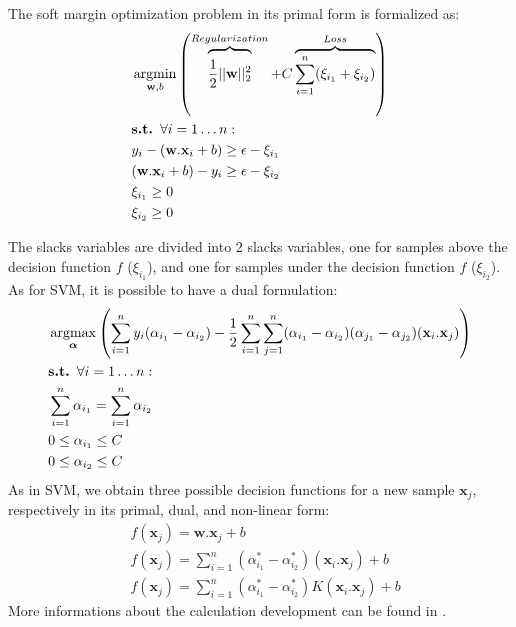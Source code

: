 \noindent The soft margin optimization problem in its primal form is formalized as:
	\begin{align}
		& \argmin_{\textbf{w},b}  \left( 
		\overbrace{\vphantom{\sum_{i=1}^n \xi_i}
			\frac{1}{2}||\textbf{w}||^2_2}^{Regularization}
		+ C \overbrace{\sum\limits_{i=1}^{n}(\xi_{i_1}+\xi_{i_2})}^{Loss}
		\right) 
		\label{eq:objectiveSVR}\\
		& \textbf{s.t. } \forall i=1 \ldots n: \nonumber\\
		& y_i-(\textbf{w}.\textbf{x}_i+b) \geq \epsilon -\xi_{i_1} \\
		& (\textbf{w}.\textbf{x}_i+b)-y_i \geq \epsilon -\xi_{i_2} \\
		&  \xi_{i_1} \geq 0 \\
		&  \xi_{i_2} \geq 0
	\end{align}

\noindent The slacks variables are divided into 2 slacks variables, one for samples above the decision function $f$ ($\xi_{i_1}$), and one for samples under the decision function $f$ ($\xi_{i_2}$). As for SVM, it is possible to have a dual formulation:
	\begin{align}
		& \argmax_{\boldsymbol{\alpha}} 
		\left( 
		\sum\limits_{i=1}^{n} y_i(\alpha_{i_1}-\alpha_{i_2})
		-\frac{1}{2} \sum\limits_{i=1}^{n} \sum\limits_{j=1}^{n} (\alpha_{i_1}-\alpha_{i_2})(\alpha_{j_1}-\alpha_{j_2}) (\textbf{x}_i.\textbf{x}_j)
		\right) \\ 
		& \textbf{s.t. } \forall i=1 \ldots n: \nonumber\\
		& \sum\limits_{i=1}^{n} \alpha_{i_1} = \sum\limits_{i=1}^{n} \alpha_{i_2} \\
		& 0 \leq \alpha_{i_1} \leq C \\
		& 0 \leq \alpha_{i_2} \leq C
	\end{align}
\noindent As in SVM, we obtain three possible decision functions for a new sample $\textbf{x}_j$, respectively in its primal, dual, and non-linear form:
\begin{align}
	& f(\textbf{x}_j) = \textbf{w}.\textbf{x}_j+b \\ 
	& f(\textbf{x}_j) = \sum\limits_{i=1}^{n} (\alpha_{i_1}^*-\alpha_{i_2}^*)(\textbf{x}_i.\textbf{x}_j) + b \\	
	& f(\textbf{x}_j) = \sum\limits_{i=1}^{n} (\alpha_{i_1}^*-\alpha_{i_2}^*)K(\textbf{x}_i.\textbf{x}_j) + b
\end{align}	
More informations about the calculation development can be found in \cite{Bishop2006}.

